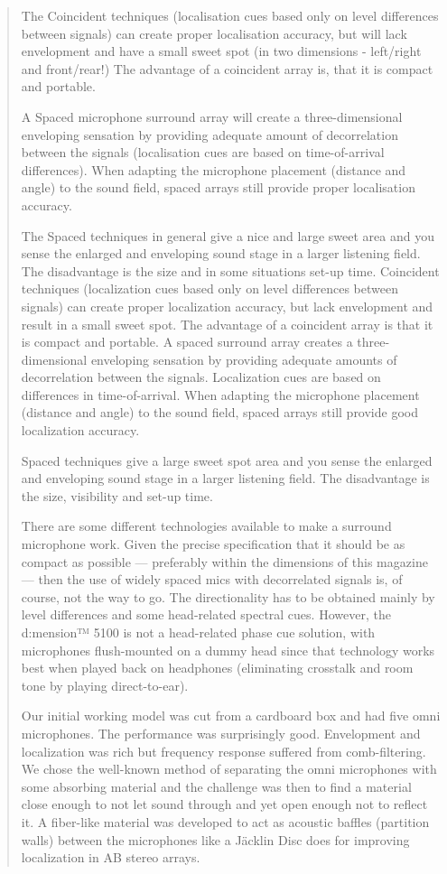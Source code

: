 \documentclass[a4paper,11pt]{article}
\begin{document}
\begin{quotation}
The Coincident techniques (localisation cues based only on level
differences between signals) can create proper localisation accuracy,
but will lack envelopment and have a small sweet spot (in two
dimensions - left/right and front/rear!) The advantage of a coincident
array is, that it is compact and portable.

A Spaced microphone surround array will create a three-dimensional
enveloping sensation by providing adequate amount of decorrelation
between the signals (localisation cues are based on time-of-arrival
differences). When adapting the microphone placement (distance and
angle) to the sound field, spaced arrays still provide proper
localisation accuracy.

The Spaced techniques in general give a nice and large sweet area and
you sense the enlarged and enveloping sound stage in a larger
listening field. The disadvantage is the size and in some situations
set-up time. Coincident techniques (localization cues based only on
level differences between signals) can create proper localization
accuracy, but lack envelopment and result in a small sweet spot. The
advantage of a coincident array is that it is compact and portable. A
spaced surround array creates a three-dimensional enveloping sensation
by providing adequate amounts of decorrelation between the signals.
Localization cues are based on differences in time-of-arrival. When
adapting the microphone placement (distance and angle) to the sound
field, spaced arrays still provide good localization accuracy.

Spaced techniques give a large sweet spot area and you sense the
enlarged and enveloping sound stage in a larger listening field. The
disadvantage is the size, visibility and set-up time.

There are some different technologies available to make a surround
microphone work. Given the precise specification that it should be as
compact as possible --- preferably within the dimensions of this
magazine --- then the use of widely spaced mics with decorrelated
signals is, of course, not the way to go. The directionality has to be
obtained mainly by level differences and some head-related spectral
cues. However, the d:mension™ 5100 is not a head-related phase cue
solution, with microphones flush-mounted on a dummy head since that
technology works best when played back on headphones (eliminating
crosstalk and room tone by playing direct-to-ear).

Our initial working model was cut from a cardboard box and had five
omni microphones. The performance was surprisingly good. Envelopment
and localization was rich but frequency response suffered from
comb-filtering. We chose the well-known method of separating the omni
microphones with some absorbing material and the challenge was then to
find a material close enough to not let sound through and yet open
enough not to reflect it. A fiber-like material was developed to act
as acoustic baffles (partition walls) between the microphones like a
Jäcklin Disc does for improving localization in AB stereo arrays.


\end{quotation}
\end{document}
